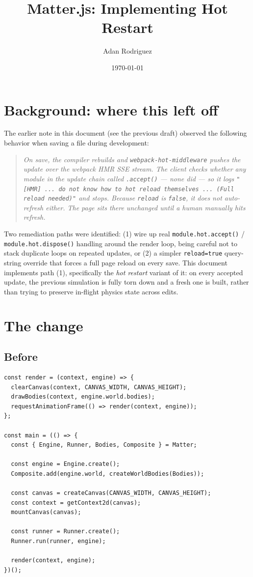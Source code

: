 \documentclass{article}
\title{Matter.js: Implementing Hot Restart}
\author{Adan Rodriguez}
\date{\today}
\begin{document}
\maketitle

\tableofcontents

\section{Background: where this left off}

The earlier note in this document (see the previous draft) observed the
following behavior when saving a file during development:

\begin{quote}
\itshape
On save, the compiler rebuilds and \texttt{webpack-hot-middleware} pushes
the update over the webpack HMR SSE stream. The client checks whether any
module in the update chain called \texttt{.accept()} --- none did --- so it
logs \texttt{"[HMR] ... do not know how to hot reload themselves ...
(Full reload needed)"} and stops. Because \texttt{reload} is \texttt{false},
it does not auto-refresh either. The page sits there unchanged until a
human manually hits refresh.
\end{quote}

Two remediation paths were identified: (1) wire up real
\texttt{module.hot.accept()} / \texttt{module.hot.dispose()} handling around
the render loop, being careful not to stack duplicate loops on repeated
updates, or (2) a simpler \texttt{reload=true} query-string override that
forces a full page reload on every save. This document implements path (1),
specifically the \emph{hot restart} variant of it: on every accepted
update, the previous simulation is fully torn down and a fresh one is
built, rather than trying to preserve in-flight physics state across edits.

\section{The change}

\subsection{Before}

\begin{lstlisting}[style=js]
const render = (context, engine) => {
  clearCanvas(context, CANVAS_WIDTH, CANVAS_HEIGHT);
  drawBodies(context, engine.world.bodies);
  requestAnimationFrame(() => render(context, engine));
};

const main = (() => {
  const { Engine, Runner, Bodies, Composite } = Matter;

  const engine = Engine.create();
  Composite.add(engine.world, createWorldBodies(Bodies));

  const canvas = createCanvas(CANVAS_WIDTH, CANVAS_HEIGHT);
  const context = getContext2d(canvas);
  mountCanvas(canvas);

  const runner = Runner.create();
  Runner.run(runner, engine);

  render(context, engine);
})();
\end{lstlisting}
\end{document}
